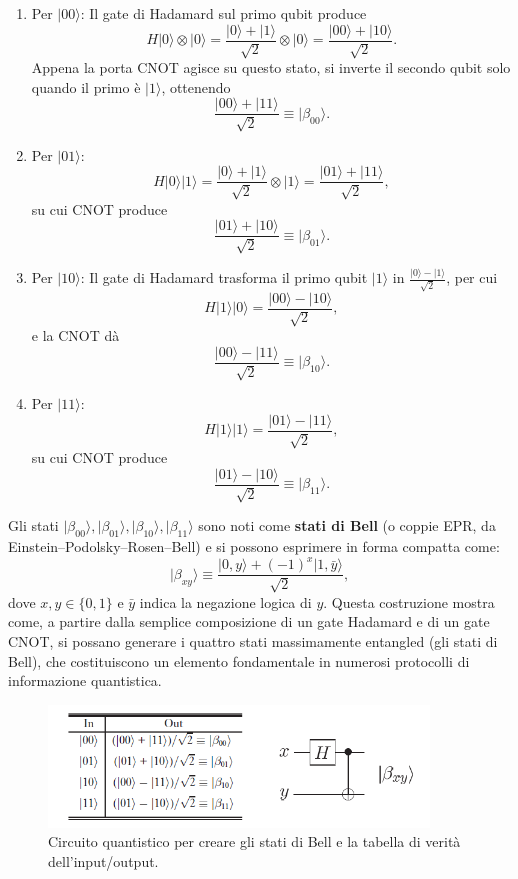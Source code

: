\documentclass[a4paper,12pt]{report}
\theoremstyle{plain}
\begin{document}
\begin{enumerate}
\item Per $\lvert 00\rangle$:
Il gate di Hadamard sul primo qubit produce
\[
H\lvert 0\rangle \otimes \lvert 0\rangle = \frac{\lvert 0\rangle + \lvert 1\rangle}{\sqrt{2}}\otimes\lvert 0\rangle = \frac{\lvert 00\rangle + \lvert 10\rangle}{\sqrt{2}}.
\]
Appena la porta CNOT agisce su questo stato, si inverte il secondo qubit solo quando il primo è $\lvert1\rangle$, ottenendo
\[
\frac{\lvert 00\rangle + \lvert 11\rangle}{\sqrt{2}} \equiv \lvert\beta_{00}\rangle.
\]
\item Per $\lvert 01\rangle$:
\[
H\lvert 0\rangle\lvert 1\rangle = \frac{\lvert 0\rangle + \lvert 1\rangle}{\sqrt{2}}\otimes \lvert 1\rangle = \frac{\lvert 01\rangle + \lvert 11\rangle}{\sqrt{2}},
\]
su cui CNOT produce
\[
\frac{\lvert 01\rangle + \lvert 10\rangle}{\sqrt{2}} \equiv \lvert\beta_{01}\rangle.
\]
\item Per $\lvert 10\rangle$:
Il gate di Hadamard trasforma il primo qubit $\lvert 1\rangle$ in $\tfrac{\lvert0\rangle - \lvert1\rangle}{\sqrt2}$, per cui
\[
H\lvert 1\rangle\lvert 0\rangle = \frac{\lvert 00\rangle - \lvert 10\rangle}{\sqrt{2}},
\]
e la CNOT dà
\[
\frac{\lvert 00\rangle - \lvert 11\rangle}{\sqrt{2}} \equiv \lvert\beta_{10}\rangle.
\]
\item Per $\lvert 11\rangle$:
\[
H\lvert 1\rangle\lvert 1\rangle = \frac{\lvert 01\rangle - \lvert 11\rangle}{\sqrt{2}},
\]
su cui CNOT produce
\[
\frac{\lvert 01\rangle - \lvert 10\rangle}{\sqrt{2}} \equiv \lvert\beta_{11}\rangle.
\]
\end{enumerate}
Gli stati $\lvert\beta_{00}\rangle,\lvert\beta_{01}\rangle,\lvert\beta_{10}\rangle,\lvert\beta_{11}\rangle$ sono noti come \textbf{stati di Bell} (o coppie EPR, da Einstein–Podolsky–Rosen–Bell) e si possono esprimere in forma compatta come:
\[
\lvert\beta_{xy}\rangle \equiv \frac{\lvert 0,y\rangle + (-1)^{x}\lvert 1,\bar y\rangle}{\sqrt{2}},
\]
dove $x,y\in\{0,1\}$ e $\bar y$ indica la negazione logica di $y$.
Questa costruzione mostra come, a partire dalla semplice composizione di un gate Hadamard e di un gate CNOT, si possano generare i quattro stati massimamente entangled (gli stati di Bell), che costituiscono un elemento fondamentale in numerosi protocolli di informazione quantistica.
\begin{figure}[H]
    \centering
    \includegraphics[width=0.9\textwidth]{Immagine12.png} 
    \caption{Circuito quantistico per creare gli stati di Bell e la tabella di verità dell'input/output.}
    \label{Immagine12}
\end{figure}
\end{document}
